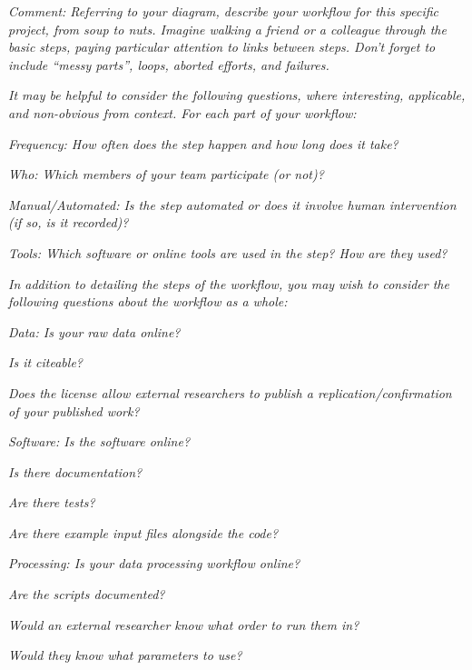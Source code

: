 \documentclass[
  11pt
]{article}
\begin{document}
\textit{Comment: Referring to your diagram, describe your workflow for this specific project, from soup to nuts. Imagine walking a friend or a colleague through the basic steps, paying particular attention to links between steps. Don't forget to include ``messy parts'', loops, aborted efforts, and failures.}

\noindent
\textit{It may be helpful to consider the following questions, where interesting, applicable, and non-obvious from context. For each part of your workflow:}

\noindent
\textit{Frequency: How often does the step happen and how long does it take?}

\noindent
\textit{Who: Which members of your team participate (or not)?}

\noindent
\textit{Manual/Automated: Is the step automated or does it involve human intervention (if so, is it recorded)?}

\noindent
\textit{Tools: Which software or online tools are used in the step? How are they used?}

\noindent
\textit{In addition to detailing the steps of the workflow, you may wish to consider the following questions about the workflow as a whole:}

\noindent
\textit{Data: Is your raw data online?}

\textit{Is it citeable?}

\textit{Does the license allow external researchers to publish a replication/confirmation of your published work?}

\noindent
\textit{Software: Is the software online?}

\textit{Is there documentation?}

\textit{Are there tests?}

\textit{Are there example input files alongside the code?}

\noindent
\textit{Processing: Is your data processing workflow online?}

\textit{Are the scripts documented?}

\textit{Would an external researcher know what order to run them in?}

\textit{Would they know what parameters to use?}

\vspace*{1cm}
\end{document}
